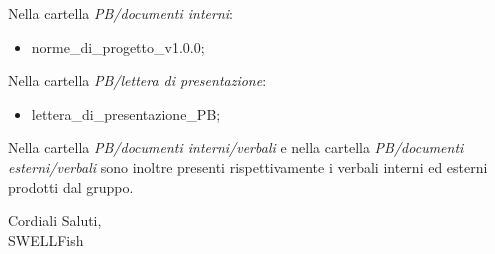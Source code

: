 \documentclass[12pt]{article}
\begin{document}
Nella cartella \textit{PB/documenti interni}:
    \begin{itemize}
    \item norme\_di\_progetto\_v1.0.0;
    \end{itemize}

Nella cartella \textit{PB/lettera di presentazione}:
    \begin{itemize}
    \item lettera\_di\_presentazione\_PB;
    \end{itemize}

Nella cartella \textit{PB/documenti interni/verbali} e nella cartella \textit{PB/documenti
esterni/verbali} sono inoltre presenti rispettivamente i verbali interni ed esterni prodotti dal gruppo. 

\begin{flushright}
Cordiali Saluti,\\
SWELLFish
\end{flushright}
\end{document}
